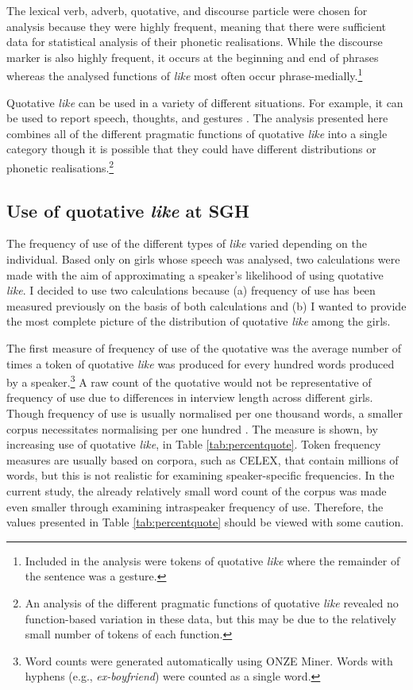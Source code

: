 \noindent The lexical verb, adverb, quotative, and discourse particle were chosen for analysis because they were highly frequent, meaning that there were sufficient data for statistical analysis of their phonetic realisations.  While the discourse marker is also highly frequent, it occurs at the beginning and end of phrases whereas the analysed functions of \textit{like} most often occur phrase-medially.\footnote{Included in the analysis were tokens of quotative \textit{like} where the remainder of the sentence was a gesture.}

Quotative \textit{like} can be used in a variety of different situations.  For example, it can be used to report speech, thoughts, and gestures \cite{romainelange1991}.  The analysis presented here combines all of the different pragmatic functions of quotative \textit{like} into a single category though it is possible that they could have different distributions or phonetic realisations.\footnote{An analysis of the different pragmatic functions of quotative \textit{like} revealed no function-based variation in these data, but this may be due to the relatively small number of tokens of each function.}



\subsection{Use of quotative \textit{like} at SGH}\label{section:uselike}



The frequency of use of the different types of \textit{like} varied depending on the individual.  Based only on girls whose speech was analysed, two calculations were made with the aim of approximating a speaker's likelihood of using quotative \textit{like}.  I decided to use two calculations because (a) frequency of use has been measured previously on the basis of both calculations and (b) I wanted to provide the most complete picture of the distribution of quotative \textit{like} among the girls.

The first measure of frequency of use of the quotative was the average number of times a token of quotative \textit{like} was produced for every hundred words produced by a speaker.\footnote{Word counts were generated automatically using ONZE Miner.  Words with hyphens (e.g., \textit{ex-boyfriend}) were counted as a single word.}  A raw count of the quotative would not be representative of frequency of use due to differences in interview length across different girls.  Though frequency of use is usually normalised per one thousand words, a smaller corpus necessitates normalising per one hundred \cite[264]{biberetal1998}.  The measure is shown, by increasing use of quotative \textit{like}, in Table \ref{tab:percentquote}.  Token frequency measures are usually based on corpora, such as CELEX, that contain millions of words, but this is not realistic for examining speaker-specific frequencies.  In the current study, the already relatively small word count of the corpus was made even smaller through examining intraspeaker frequency of use.  Therefore, the values presented in Table \ref{tab:percentquote} should be viewed with some caution.
  

